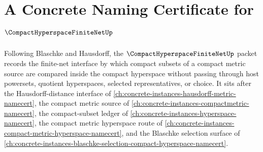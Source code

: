 \chapter{A Concrete Naming Certificate for $\CompactHyperspaceFiniteNetUp$}
\label{ch:concrete-instances-compact-hyperspace-finite-net-namecert}

Following Blaschke and Hausdorff, the $\CompactHyperspaceFiniteNetUp$ packet records the finite-net interface by which compact subsets of a compact metric source are compared inside the compact hyperspace without passing through host powersets, quotient hyperspaces, selected representatives, or choice. It sits after the Hausdorff-distance interface of \autoref{ch:concrete-instances-hausdorff-metric-namecert}, the compact metric source of \autoref{ch:concrete-instances-compactmetric-namecert}, the compact-subset ledger of \autoref{ch:concrete-instances-hyperspace-namecert}, the compact metric hyperspace route of \autoref{ch:concrete-instances-compact-metric-hyperspace-namecert}, and the Blaschke selection surface of \autoref{ch:concrete-instances-blaschke-selection-compact-hyperspace-namecert}.

